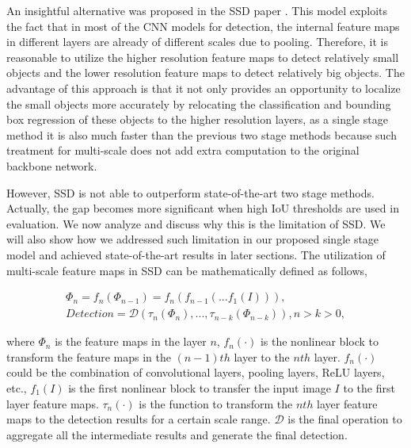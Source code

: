 \documentclass[10pt,twocolumn,letterpaper]{article}
\begin{document}
An insightful alternative was proposed in the SSD paper \cite{liu15ssd}. This model exploits the fact that in most of the CNN models for detection, the internal feature maps in different layers are already of different scales due to pooling. Therefore, it is reasonable to utilize the higher resolution feature maps to detect relatively small objects and the lower resolution feature maps to detect relatively big objects. The advantage of this approach is that it not only provides an opportunity to localize the small objects more accurately by relocating the classification and bounding box regression of these objects to the higher resolution layers, as a single stage method it is also much faster than the previous two stage methods because such treatment for multi-scale does not add extra computation to the original backbone network.

However, SSD is not able to outperform state-of-the-art two stage methods. Actually, the gap becomes more significant when high IoU thresholds are used in evaluation. We now analyze and discuss why this is the limitation of SSD. We will also show how we addressed such limitation in our proposed single stage model and achieved state-of-the-art results in later sections. The utilization of multi-scale feature maps in SSD can be mathematically defined as follows,

\vspace{-0.5\baselineskip}
\begin{eqnarray}
\Phi_{n} = f_{n}(\Phi_{n-1}) = f_{n}(f_{n-1}(...f_{1}(I))), \label{eq:std_ssd1} \\
Detection = \mathcal{D}(\tau_{n}(\Phi_{n}),...,\tau_{n-k}(\Phi_{n-k})), n \! > \! k \! > \! 0,
\label{eq:std_ssd2}
\end{eqnarray}

\noindent where $\Phi_{n}$ is the feature maps in the layer $n$, $f_{n}(\cdot)$ is the nonlinear block to transform the feature maps in the $(n-1)th$ layer to the $nth$ layer. $f_{n}(\cdot)$ could be the combination of convolutional layers, pooling layers, ReLU layers, etc., $f_{1}(I)$ is the first nonlinear block to transfer the input image $I$ to the first layer feature maps. $\tau_{n}(\cdot)$ is the function to transform the $nth$ layer feature maps to the detection results for a certain scale range. $\mathcal{D}$ is the final operation to aggregate all the intermediate results and generate the final detection.
\end{document}
